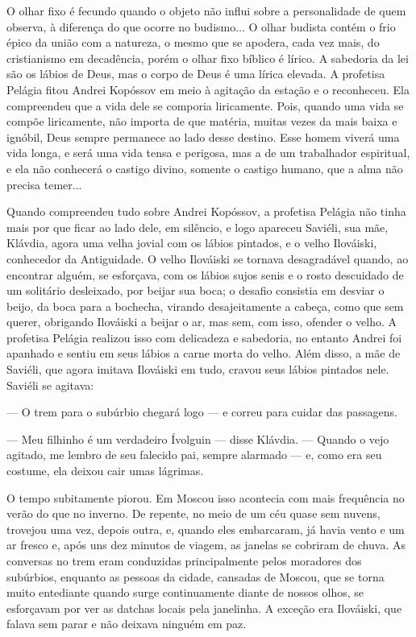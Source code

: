 O olhar fixo é fecundo quando o objeto não influi sobre a personalidade
de quem observa, à diferença do que ocorre no budismo... O olhar budista
contém o frio épico da união com a natureza, o mesmo que se apodera,
cada vez mais, do cristianismo em decadência, porém o olhar fixo bíblico
é lírico. A sabedoria da lei são os lábios de Deus, mas o corpo de Deus
é uma lírica elevada. A profetisa Pelágia fitou Andrei Kopóssov em meio
à agitação da estação e o reconheceu. Ela compreendeu que a vida dele se
comporia liricamente. Pois, quando uma vida se compõe liricamente, não
importa de que matéria, muitas vezes da mais baixa e ignóbil, Deus
sempre permanece ao lado desse destino. Esse homem viverá uma vida
longa, e será uma vida tensa e perigosa, mas a de um trabalhador
espiritual, e ela não conhecerá o castigo divino, somente o castigo
humano, que a alma não precisa temer...

Quando compreendeu tudo sobre Andrei Kopóssov, a profetisa Pelágia não
tinha mais por que ficar ao lado dele, em silêncio, e logo apareceu
Saviéli, sua mãe, Klávdia, agora uma velha jovial com os lábios
pintados, e o velho Ilováiski, conhecedor da Antiguidade. O velho
Ilováiski se tornava desagradável quando, ao encontrar alguém, se
esforçava, com os lábios sujos senis e o rosto descuidado de um
solitário desleixado, por beijar sua boca; o desafio consistia em
desviar o beijo, da boca para a bochecha, virando desajeitamente a
cabeça, como que sem querer, obrigando Ilováiski a beijar o ar, mas sem,
com isso, ofender o velho. A profetisa Pelágia realizou isso com
delicadeza e sabedoria, no entanto Andrei foi apanhado e sentiu em seus
lábios a carne morta do velho. Além disso, a mãe de Saviéli, que agora
imitava Ilováiski em tudo, cravou seus lábios pintados nele. Saviéli se
agitava:

--- O trem para o subúrbio chegará logo --- e correu para cuidar das
passagens.

--- Meu filhinho é um verdadeiro Ívolguin --- disse Klávdia. --- Quando
o vejo agitado, me lembro de seu falecido pai, sempre alarmado --- e,
como era seu costume, ela deixou cair umas lágrimas.

O tempo subitamente piorou. Em Moscou isso acontecia com mais frequência
no verão do que no inverno. De repente, no meio de um céu quase sem
nuvens, trovejou uma vez, depois outra, e, quando eles embarcaram, já
havia vento e um ar fresco e, após uns dez minutos de viagem, as janelas
se cobriram de chuva. As conversas no trem eram conduzidas
principalmente pelos moradores dos subúrbios, enquanto as pessoas da
cidade, cansadas de Moscou, que se torna muito entediante quando surge
continuamente diante de nossos olhos, se esforçavam por ver as datchas
locais pela janelinha. A exceção era Ilováiski, que falava sem parar e
não deixava ninguém em paz.

